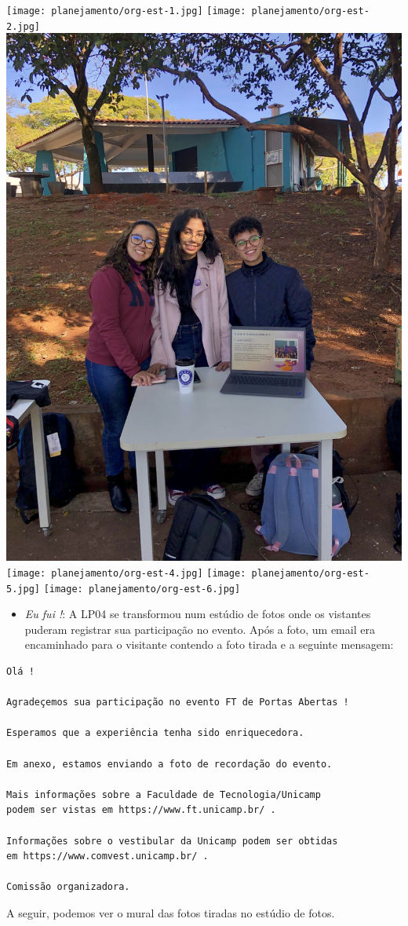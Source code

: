 \documentclass[
  letterpaper,
  DIV=11,
  numbers=noendperiod]{scrreprt}
\providecommand{\tightlist}{%
  \setlength{\itemsep}{0pt}\setlength{\parskip}{0pt}}\usepackage{longtable,booktabs,array}
\begin{document}
\texttt{[image: planejamento/org-est-1.jpg]}
\texttt{[image: planejamento/org-est-2.jpg]}
\includegraphics[width=0.4\linewidth,height=\textheight,keepaspectratio]{planejamento/org-est-3.jpg}
\texttt{[image: planejamento/org-est-4.jpg]}
\texttt{[image: planejamento/org-est-5.jpg]}
\texttt{[image: planejamento/org-est-6.jpg]}

\begin{itemize}
\tightlist
\item
  \emph{Eu fui !}: A LP04 se transformou num estúdio de fotos onde os
  vistantes puderam registrar sua participação no evento. Após a foto,
  um email era encaminhado para o visitante contendo a foto tirada e a
  seguinte mensagem:
\end{itemize}

\begin{verbatim}
Olá !

Agradeçemos sua participação no evento FT de Portas Abertas !

Esperamos que a experiência tenha sido enriquecedora.

Em anexo, estamos enviando a foto de recordação do evento.

Mais informações sobre a Faculdade de Tecnologia/Unicamp
podem ser vistas em https://www.ft.unicamp.br/ .

Informações sobre o vestibular da Unicamp podem ser obtidas 
em https://www.comvest.unicamp.br/ .

Comissão organizadora.
\end{verbatim}

A seguir, podemos ver o mural das fotos tiradas no estúdio de fotos.
\end{document}
